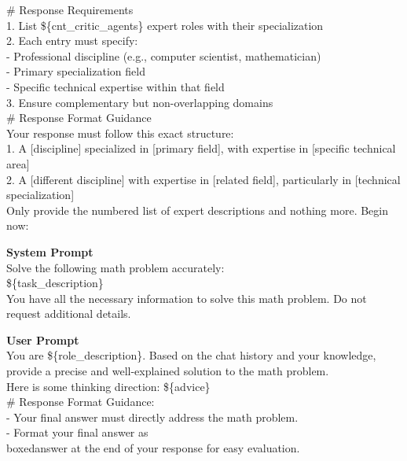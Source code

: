 \begin{tcolorbox}[
  title=Expert Recruiter Prompts,
  breakable,
  colback=white,
  colframe=black
]
\# Response Requirements \\
1. List \$\{cnt\_critic\_agents\} expert roles with their specialization \\
2. Each entry must specify: \\
   - Professional discipline (e.g., computer scientist, mathematician) \\
   - Primary specialization field \\
   - Specific technical expertise within that field \\
3. Ensure complementary but non-overlapping domains \\

\# Response Format Guidance \\
Your response must follow this exact structure: \\
1. A [discipline] specialized in [primary field], with expertise in [specific technical area] \\
2. A [different discipline] with expertise in [related field], particularly in [technical specialization] \\

Only provide the numbered list of expert descriptions and nothing more. Begin now: \\

\end{tcolorbox}




\begin{tcolorbox}[
  title=Problem Solver 1 Prompts,
  breakable,
  colback=white,
  colframe=black
]

\textbf{System Prompt} \\
Solve the following math problem accurately: \\
\$\{task\_description\} \\

You have all the necessary information to solve this math problem. Do not request additional details.

\textbf{User Prompt} \\
You are \$\{role\_description\}. Based on the chat history and your knowledge, provide a precise and well-explained solution to the math problem. \\
Here is some thinking direction: \$\{advice\} \\

\# Response Format Guidance: \\
- Your final answer must directly address the math problem. \\
- Format your final answer as \\boxed{answer} at the end of your response for easy evaluation. \\

\end{tcolorbox}





